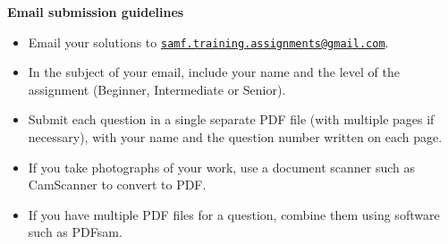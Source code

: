 \documentclass{article}
\begin{document}
\vfill
\textbf{\Large Email submission guidelines}
\begin{itemize}
	\item Email your solutions to \href{mailto:samf.training.assignments@gmail.com}{\texttt{samf.training.assignments@gmail.com}}.
	\item In the subject of your email, include your name and the level of the assignment (Beginner, Intermediate or Senior).
	\item Submit each question in a single separate PDF file (with multiple pages if necessary), with your name and the question number written on each page.
	\item If you take photographs of your work, use a document scanner such as CamScanner to convert to PDF.
	\item If you have multiple PDF files for a question, combine them using software such as PDFsam.
\end{itemize}
\end{document}
